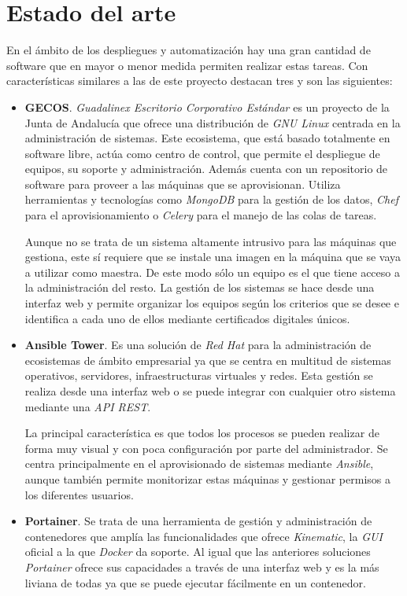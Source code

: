 \chapter{Estado del arte}

En el ámbito de los despliegues y automatización hay una gran cantidad de software que en mayor o menor medida permiten realizar estas tareas. Con características similares a las de este proyecto destacan tres y son las siguientes:

\begin{itemize}
	\item \textbf{GECOS}. \textit{Guadalinex Escritorio Corporativo Estándar} es un proyecto de la Junta de Andalucía que ofrece una distribución de \textit{GNU Linux} centrada en la administración de sistemas. Este ecosistema, que está basado totalmente en software libre, actúa como centro de control, que permite el despliegue de equipos, su soporte y administración. Además cuenta con un repositorio de software para proveer a las máquinas que se aprovisionan. Utiliza herramientas y tecnologías como \textit{MongoDB} para la gestión de los datos, \textit{Chef} para el aprovisionamiento o \textit{Celery} para el manejo de las colas de tareas.
	
	Aunque no se trata de un sistema altamente intrusivo para las máquinas que gestiona, este sí requiere que se instale una imagen en la máquina que se vaya a utilizar como maestra. De este modo sólo un equipo es el que tiene acceso a la administración del resto. La gestión de los sistemas se hace desde una interfaz web y permite organizar los equipos según los criterios que se desee e identifica a cada uno de ellos mediante certificados digitales únicos.
		
	\item \textbf{Ansible Tower}. Es una solución de \textit{Red Hat} para la administración de ecosistemas de ámbito empresarial ya que se centra en multitud de sistemas operativos, servidores, infraestructuras virtuales y redes. Esta gestión se realiza desde una interfaz web o se puede integrar con cualquier otro sistema mediante una \textit{API REST}.
	
	La principal característica es que todos los procesos se pueden realizar de forma muy visual y con poca configuración por parte del administrador. Se centra principalmente en el aprovisionado de sistemas mediante \textit{Ansible}, aunque también permite monitorizar estas máquinas y gestionar permisos a los diferentes usuarios.
		
	\item \textbf{Portainer}. Se trata de una herramienta de gestión y administración de contenedores que amplía las funcionalidades que ofrece \textit{Kinematic}, la \textit{GUI} oficial a la que \textit{Docker} da soporte. Al igual que las anteriores soluciones \textit{Portainer} ofrece sus capacidades a través de una interfaz web y es la más liviana de todas ya que se puede ejecutar fácilmente en un contenedor.
	

\end{itemize}
